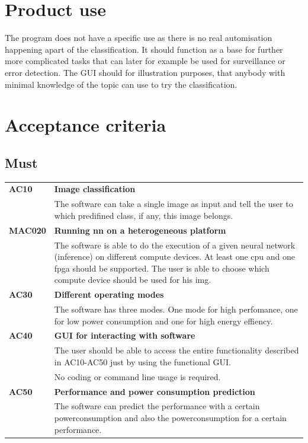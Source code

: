 \documentclass[parskip=full]{scrartcl}
\begin{document}
\section{Product use}
The program does not have a specific use as there is no real automisation happening apart of the classification. It should function as a base for further more complicated tasks that can later for example be used for surveillance or error detection. The GUI should for illustration purposes, that anybody with minimal knowledge of the topic can use to try the classification.

\section{Acceptance criteria}
\subsection{Must}
\begin{tabular}{p{2cm}p{11.4cm}}
\textbf{AC10} & \textbf{Image classification} \\
& The software can take a single image as input and tell the user to which predifined class, if any, this image belongs.\\
\textbf{MAC020} & \textbf{Running \gls{nn} on a heterogeneous platform} \\
& The software is able to do the execution of a given neural network (inference) on different compute devices. At least one \gls{cpu} and one \gls{fpga} should be supported.
The user is able to choose which compute device should be used for his \gls{img}.\\
\textbf{AC30} & \textbf{Different operating modes} \\
& The software has three modes. One mode for high perfomance, one for low power consumption and one for high energy effiency. \\
\textbf{AC40} & \textbf{GUI for interacting with software} \\
& The user should be able to access the entire functionality described in AC10-AC50 just by using the functional GUI.\\ 
& No coding or command line usage is required.\\
\textbf{AC50} & \textbf{Performance and power consumption prediction}\\
& The software can predict the performance with a certain powerconsumption and also the powerconsumption for a certain performance.

\end{tabular}
\end{document}
